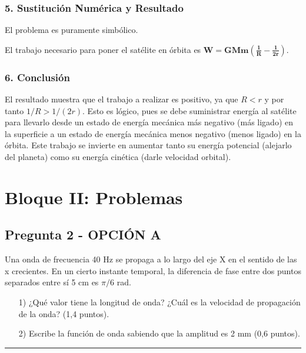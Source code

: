 \subsubsection*{5. Sustitución Numérica y Resultado}
El problema es puramente simbólico.
\begin{cajaresultado}
El trabajo necesario para poner el satélite en órbita es $\boldsymbol{W = GMm \left(\frac{1}{R} - \frac{1}{2r}\right)}$.
\end{cajaresultado}

\subsubsection*{6. Conclusión}
\begin{cajaconclusion}
El resultado muestra que el trabajo a realizar es positivo, ya que $R<r$ y por tanto $1/R > 1/(2r)$. Esto es lógico, pues se debe suministrar energía al satélite para llevarlo desde un estado de energía mecánica más negativo (más ligado) en la superficie a un estado de energía mecánica menos negativo (menos ligado) en la órbita. Este trabajo se invierte en aumentar tanto su energía potencial (alejarlo del planeta) como su energía cinética (darle velocidad orbital).
\end{cajaconclusion}

\newpage

\section{Bloque II: Problemas}
\label{sec:ondas_2007_sep_ext}

\subsection{Pregunta 2 - OPCIÓN A}
\label{subsec:2A_2007_sep_ext}

\begin{cajaenunciado}
Una onda de frecuencia 40 Hz se propaga a lo largo del eje X en el sentido de las x crecientes. En un cierto instante temporal, la diferencia de fase entre dos puntos separados entre sí 5 cm es $\pi/6$ rad.
\begin{enumerate}
    \item[1)] ¿Qué valor tiene la longitud de onda? ¿Cuál es la velocidad de propagación de la onda? (1,4 puntos).
    \item[2)] Escribe la función de onda sabiendo que la amplitud es 2 mm (0,6 puntos).
\end{enumerate}
\end{cajaenunciado}
\hrule

